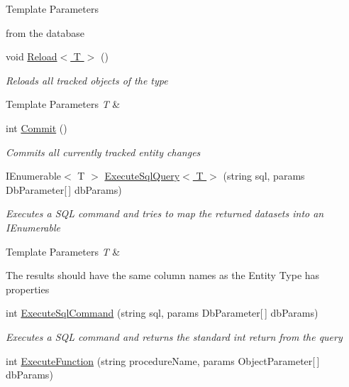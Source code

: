 \begin{DoxyCompactItemize}
\begin{DoxyCompactList}
\begin{DoxyTemplParams}{Template Parameters}
\hline
\end{DoxyTemplParams}
from the database \end{DoxyCompactList}\item 
void \hyperlink{class_highway_1_1_data_1_1_entity_framework_1_1_contexts_1_1_entity_framework_context_afb94c4b4111081a2b1100591f5298db1}{Reload$<$ T $>$} ()
\begin{DoxyCompactList}\small\item\em Reloads all tracked objects of the type 
\begin{DoxyTemplParams}{Template Parameters}
{\em T} & \\
\hline
\end{DoxyTemplParams}
\end{DoxyCompactList}\item 
int \hyperlink{class_highway_1_1_data_1_1_entity_framework_1_1_contexts_1_1_entity_framework_context_a9a423f1dabec6bc46f393965c815237d}{Commit} ()
\begin{DoxyCompactList}\small\item\em Commits all currently tracked entity changes \end{DoxyCompactList}\item 
I\-Enumerable$<$ T $>$ \hyperlink{class_highway_1_1_data_1_1_entity_framework_1_1_contexts_1_1_entity_framework_context_a0a1fde31dabdc1a0e2cdef5dbfdefa2f}{Execute\-Sql\-Query$<$ T $>$} (string sql, params Db\-Parameter\mbox{[}$\,$\mbox{]} db\-Params)
\begin{DoxyCompactList}\small\item\em Executes a S\-Q\-L command and tries to map the returned datasets into an I\-Enumerable
\begin{DoxyTemplParams}{Template Parameters}
{\em T} & \\
\hline
\end{DoxyTemplParams}
The results should have the same column names as the Entity Type has properties \end{DoxyCompactList}\item 
int \hyperlink{class_highway_1_1_data_1_1_entity_framework_1_1_contexts_1_1_entity_framework_context_aec1f83731440a4f42b83458101020819}{Execute\-Sql\-Command} (string sql, params Db\-Parameter\mbox{[}$\,$\mbox{]} db\-Params)
\begin{DoxyCompactList}\small\item\em Executes a S\-Q\-L command and returns the standard int return from the query \end{DoxyCompactList}\item 
int \hyperlink{class_highway_1_1_data_1_1_entity_framework_1_1_contexts_1_1_entity_framework_context_aba2419c2ed299ff633303a50584d059d}{Execute\-Function} (string procedure\-Name, params Object\-Parameter\mbox{[}$\,$\mbox{]} db\-Params)
\begin{DoxyCompactList}\small\item\em \end{DoxyCompactList}\end{DoxyCompactItemize}
